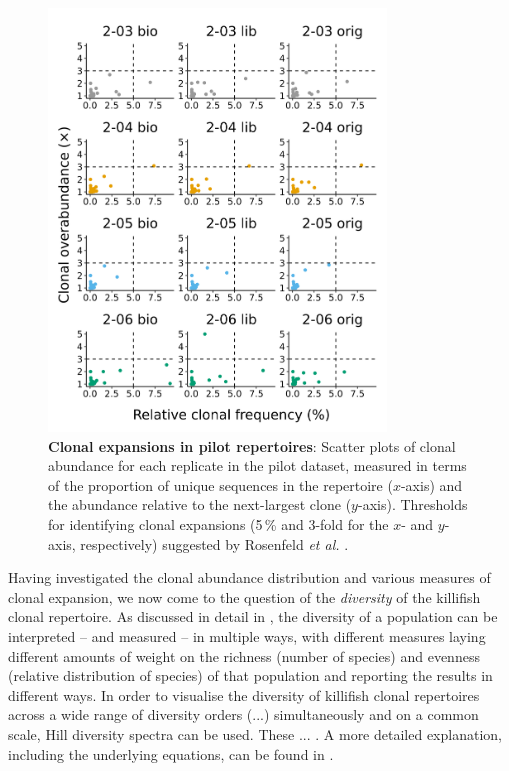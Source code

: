 \begin{figure}
\centering
\includegraphics[width=0.8\textwidth]{_Figures/png/pilot-clones-expansions-rep}
\caption[Clonal expansions in \Nfu pilot repertoires]{\textbf{Clonal expansions in \Nfu pilot repertoires}: Scatter plots of clonal abundance for each replicate in the pilot \igseq dataset, measured in terms of the proportion of unique sequences in the repertoire ($x$-axis) and the abundance relative to the next-largest clone ($y$-axis). Thresholds for identifying clonal expansions (5\,\% and 3-fold for the $x$- and $y$-axis, respectively) suggested by Rosenfeld \textit{et al.} \parencite{rosenfeld2018clonesize}.}
\label{fig:igseq-pilot-clones-expansions-rep}
\end{figure} %

Having investigated the clonal abundance distribution and various measures of clonal expansion, we now come to the question of the \textit{diversity} of the killifish clonal repertoire. As discussed in detail in , the diversity of a population can be interpreted -- and measured -- in multiple ways, with different measures laying different amounts of weight on the richness (number of species) and evenness (relative distribution of species) of that population and reporting the results in different ways. In order to visualise the diversity of killifish clonal repertoires across a wide range of diversity orders (...) %
simultaneously and on a common scale, Hill diversity spectra %
can be used. These ... . %
A more detailed explanation, including the underlying equations, can be found in .

